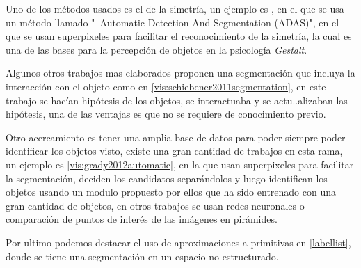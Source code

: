 Uno de los métodos usados es el de la simetría, un ejemplo es \cite{vis:kootstra2010fast}, en el que se usa un método llamado "\ Automatic Detection And Segmentation (ADAS)", en el que se usan superpixeles para facilitar el reconocimiento de la simetría, la cual es una de las bases para la percepción de objetos en la psicología \textit{Gestalt}.

Algunos otros trabajos mas elaborados proponen una segmentación que incluya la interacción con el objeto como en \cref{vis:schiebener2011segmentation}, en este trabajo se hacían hipótesis de los objetos, se interactuaba y se actu..alizaban las hipótesis, una de las ventajas es que no se requiere de conocimiento previo.

Otro acercamiento es tener una amplia base de datos para poder siempre poder identificar los objetos visto, existe una gran cantidad de trabajos en esta rama, un ejemplo es \cref{vis:grady2012automatic}, en la que usan superpixeles para facilitar la segmentación, deciden los candidatos separándolos y luego identifican los objetos usando un modulo propuesto por ellos que ha sido entrenado con una gran cantidad de objetos, en otros trabajos se usan redes neuronales o comparación de puntos de interés de las imágenes en pirámides.

Por ultimo podemos destacar el uso de aproximaciones a primitivas en \ref{labellist}, donde se tiene una segmentación en un espacio no estructurado.

    
